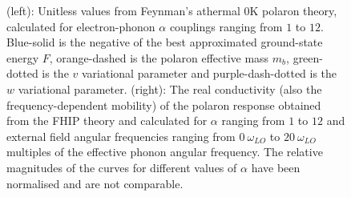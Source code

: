 \begin{figure}
\caption{(left): Unitless values from Feynman's athermal $0$K polaron theory, calculated for electron-phonon $\alpha$ couplings ranging from $1$ to $12$. Blue-solid is the negative of the best approximated ground-state energy $F$, orange-dashed is the polaron effective mass $m_b$, green-dotted is the $v$ variational parameter and purple-dash-dotted is the $w$ variational parameter. (right): The real conductivity (also the frequency-dependent mobility) of the polaron response obtained from the FHIP theory and calculated for $\alpha$ ranging from $1$ to $12$ and external field angular frequencies ranging from $0\ \omega_{LO}$ to $20\ \omega_{LO}$ multiples of the effective phonon angular frequency. The relative magnitudes of the curves for different values of $\alpha$ have been normalised and are not comparable.}
\label{fig:athermaltheory}
\end{figure}

